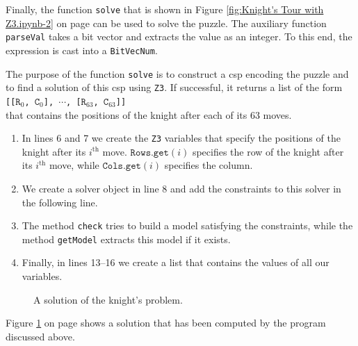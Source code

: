 Finally, the function \texttt{solve} that is shown in Figure \ref{fig:Knight's Tour with Z3.ipynb-2} on page
\pageref{fig:Knight's Tour with Z3.ipynb-2} can be used to solve the puzzle.
The auxiliary function \texttt{parseVal} takes a bit vector and extracts the value as an integer.  To this end,
the expression is cast into a \texttt{BitVecNum}.

The purpose of the function \texttt{solve} is to construct a \Gls{csp} encoding the puzzle and to find a
solution of this \Gls{csp} using \texttt{Z3}.
If successful, it returns a list of the form
\\[0.2cm]
\hspace*{1.3cm}
\texttt{[[$\mathtt{R}_0$, $\mathtt{C}_0$], $\cdots$, [$\mathtt{R}_{63}$, $\mathtt{C}_{63}$]]} 
\\[0.2cm]
that contains the positions of the knight after each of its 63 moves.
\begin{enumerate}
\item In lines 6 and 7 we create the \texttt{Z3} variables that specify the positions of the knight after its
      $i^{\mathrm{th}}$ move.  $\texttt{Rows.get}(i)$ specifies the row of the knight after its
      $i^{\mathrm{th}}$ move, while $\texttt{Cols.get}(i)$ specifies the column.
\item We create a solver object in line 8 and add the constraints to this solver in the following line.
\item The method \texttt{check} tries to build a model satisfying the constraints, while the method
      \texttt{getModel} extracts this model if it exists.
\item Finally, in lines 13--16 we create a list that contains the values of all our variables.
\end{enumerate}

\begin{figure}[!ht]
  \centering
  \caption{A solution of the knight's problem.}
  \label{fig:knights-problem.png}
\end{figure}

\noindent
Figure \ref{fig:knights-problem.png} on page \pageref{fig:knights-problem.png} shows a solution that has been
computed by the program discussed above.







